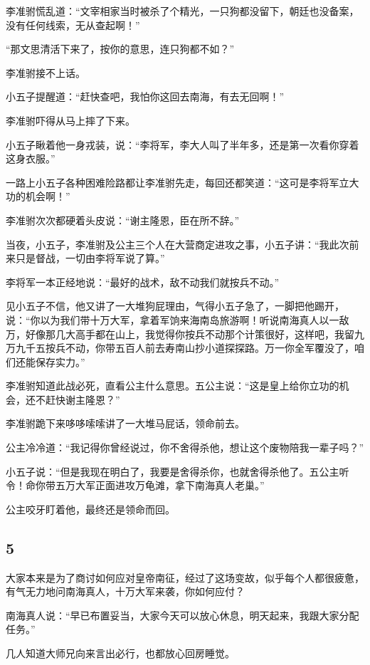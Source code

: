李准驸慌乱道：“文宰相家当时被杀了个精光，一只狗都没留下，朝廷也没备案，没有任何线索，无从查起啊！”

“那文思清活下来了，按你的意思，连只狗都不如？”

李准驸接不上话。

小五子提醒道：“赶快查吧，我怕你这回去南海，有去无回啊！”

李准驸吓得从马上摔了下来。

小五子瞅着他一身戎装，说：“李将军，李大人叫了半年多，还是第一次看你穿着这身衣服。”

一路上小五子各种困难险路都让李准驸先走，每回还都笑道：“这可是李将军立大功的机会啊！”

李准驸次次都硬着头皮说：“谢主隆恩，臣在所不辞。”
\newline

当夜，小五子，李准驸及公主三个人在大营商定进攻之事，小五子讲：“我此次前来只是督战，一切由李将军说了算。”

李将军一本正经地说：“最好的战术，敌不动我们就按兵不动。”

见小五子不信，他又讲了一大堆狗屁理由，气得小五子急了，一脚把他踢开，说：“你以为我们带十万大军，拿着军饷来海南岛旅游啊！听说南海真人以一敌万，好像那几大高手都在山上，我觉得你按兵不动那个计策很好，这样吧，我留九万九千五按兵不动，你带五百人前去寿南山抄小道探探路。万一你全军覆没了，咱们还能保存实力。”

李准驸知道此战必死，直看公主什么意思。五公主说：“这是皇上给你立功的机会，还不赶快谢主隆恩？”

李准驸跪下来哆哆嗦嗦讲了一大堆马屁话，领命前去。

公主冷冷道：“我记得你曾经说过，你不舍得杀他，想让这个废物陪我一辈子吗？”

小五子说：“但是我现在明白了，我要是舍得杀你，也就舍得杀他了。五公主听令！命你带五万大军正面进攻万龟滩，拿下南海真人老巢。”

公主咬牙盯着他，最终还是领命而回。
\newline

{\centering\subsection{5}}

大家本来是为了商讨如何应对皇帝南征，经过了这场变故，似乎每个人都很疲惫，有气无力地问南海真人，十万大军来袭，你如何应付？

南海真人说：“早已布置妥当，大家今天可以放心休息，明天起来，我跟大家分配任务。”

几人知道大师兄向来言出必行，也都放心回房睡觉。


